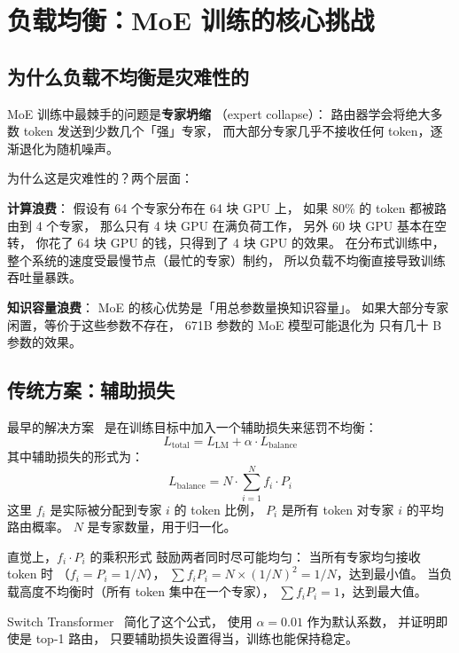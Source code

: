 \section{负载均衡：MoE 训练的核心挑战}

\subsection{为什么负载不均衡是灾难性的}

MoE 训练中最棘手的问题是\textbf{专家坍缩}
（expert collapse）：
路由器学会将绝大多数 token 发送到少数几个「强」专家，
而大部分专家几乎不接收任何 token，逐渐退化为随机噪声。

为什么这是灾难性的？两个层面：

\textbf{计算浪费}：
假设有 64 个专家分布在 64 块 GPU 上，
如果 80\% 的 token 都被路由到 4 个专家，
那么只有 4 块 GPU 在满负荷工作，
另外 60 块 GPU 基本在空转，
你花了 64 块 GPU 的钱，只得到了 4 块 GPU 的效果。
在分布式训练中，整个系统的速度受最慢节点（最忙的专家）制约，
所以负载不均衡直接导致训练吞吐量暴跌。

\textbf{知识容量浪费}：
MoE 的核心优势是「用总参数量换知识容量」。
如果大部分专家闲置，等价于这些参数不存在，
671B 参数的 MoE 模型可能退化为
只有几十 B 参数的效果。

\subsection{传统方案：辅助损失}

最早的解决方案~\cite{shazeer2017moe}
是在训练目标中加入一个辅助损失来惩罚不均衡：
\begin{equation}
  L_{\mathrm{total}} = L_{\mathrm{LM}} + \alpha \cdot L_{\mathrm{balance}}
  \label{eq:aux-loss}
\end{equation}
其中辅助损失的形式为：
\begin{equation}
  L_{\mathrm{balance}} = N \cdot \sum_{i=1}^{N} f_i \cdot P_i
  \label{eq:balance-loss}
\end{equation}
这里 $f_i$ 是实际被分配到专家 $i$ 的 token 比例，
$P_i$ 是所有 token 对专家 $i$ 的平均路由概率。
$N$ 是专家数量，用于归一化。

直觉上，$f_i \cdot P_i$ 的乘积形式
鼓励两者同时尽可能均匀：
当所有专家均匀接收 token 时
（$f_i = P_i = 1/N$），
$\sum f_i P_i = N \times (1/N)^2 = 1/N$，达到最小值。
当负载高度不均衡时（所有 token 集中在一个专家），
$\sum f_i P_i = 1$，达到最大值。

Switch Transformer~\cite{fedus2022switch} 简化了这个公式，
使用 $\alpha = 0.01$ 作为默认系数，
并证明即使是 top-1 路由，
只要辅助损失设置得当，训练也能保持稳定。

